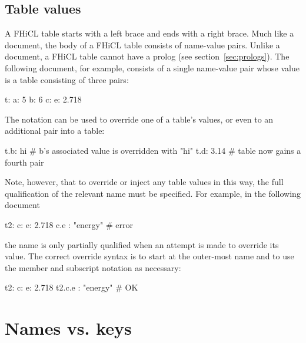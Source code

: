 \documentclass[draftmode,draftwater]{memarticle}
\newcommand{\fhicl}{FHiCL\xspace}
\begin{document}
\section{Table values}

A \fhicl table starts with a left brace and ends with a right brace.
Much like a document, the body of a \fhicl table consists of
name-value pairs.  Unlike a document, a \fhicl table cannot have a
prolog (see section~\ref{sec:prologs}).  The following document, for example, consists of a single
name-value pair whose value is a table consisting of three pairs:
%
\Needspace{0.67in}
\begin{fcllisting}[texcl,escapechar=`]
t: {
   a: 5
   b: 6
   c: { e: 2.718 }
}
\end{fcllisting}

The  notation can be used to override one of a table's values,
or even to  an additional pair into a table:
%
\Needspace{0.34in}
\begin{fcllisting}[texcl,escapechar=`]
t.b: hi    # b's associated value is overridden with "hi"
t.d: 3.14  # table now gains a fourth pair
\end{fcllisting}

Note, however, that to override or inject any table values in this
way, the full qualification of the relevant name must be specified.
For example, in the following document
%
\Needspace{0.34in}
\begin{fcllisting}[texcl,escapechar=`]
t2: {
   c: { e: 2.718 }
   c.e : "energy"     # error
}
\end{fcllisting}
the name  is only partially qualified when an attempt is
made to override its value.  The correct override syntax is to start
at the outer-most name and to use the member and subscript notation as
necessary:
%
\Needspace{0.34in}
\begin{fcllisting}[texcl,escapechar=`]
t2: { c: { e: 2.718 } }
t2.c.e : "energy"     # OK
\end{fcllisting}

\chapter{Names vs. keys}
\end{document}
